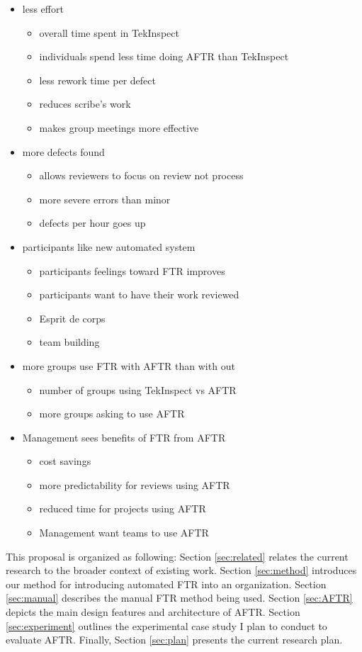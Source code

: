 \begin{itemize}
\item{less effort}
  \begin{itemize}
  \item{overall time spent in TekInspect}
  \item{individuals spend less time doing AFTR than TekInspect}
  \item{less rework time per defect}
  \item{reduces scribe's work}
  \item{makes group meetings more effective}
  \end{itemize}
\item{more defects found}
  \begin{itemize}
  \item{allows reviewers to focus on review not process}
  \item{more severe errors than minor}
  \item{defects per hour goes up}
  \end{itemize}
\item{participants like new automated system}
  \begin{itemize}
  \item{participants feelings toward FTR improves}
  \item{participants want to have their work reviewed}
  \item{Esprit de corps}
  \item{team building}
  \end{itemize}
\item{more groups use FTR with AFTR than with out}
  \begin{itemize}
  \item{number of groups using TekInspect vs AFTR}
  \item{more groups asking to use AFTR}
  \end{itemize}
\item{Management sees benefits of FTR from AFTR}
  \begin{itemize}
  \item{cost savings}
  \item{more predictability for reviews using AFTR}
  \item{reduced time for projects using AFTR}
  \item{Management want teams to use AFTR}
  \end{itemize}
\end{itemize}

This proposal is organized as following: Section \ref{sec:related} relates
the current research to the broader context of existing work.  Section
\ref{sec:method} introduces our method for introducing automated FTR into
an organization.  Section \ref{sec:manual} describes the manual FTR method
being used.  Section \ref{sec:AFTR} depicts the main design features and
architecture of AFTR.  Section \ref{sec:experiment} outlines the
experimental case study I plan to conduct to evaluate AFTR.  Finally,
Section \ref{sec:plan} presents the current research plan.


